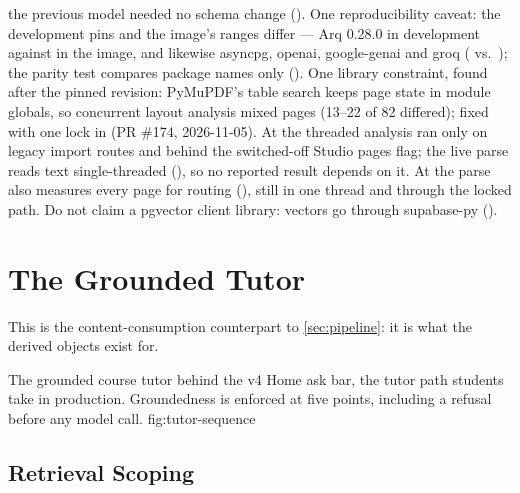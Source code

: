 {the previous model needed no schema change ().
One reproducibility caveat: the development pins and the image's ranges differ
--- Arq 0.28.0 in development against  in the image, and
likewise asyncpg, openai, google-genai and groq
( vs.\ ); the parity
test compares package names only ().
One library constraint, found after the pinned revision: PyMuPDF's table search
keeps page state in module globals, so concurrent layout analysis mixed pages
(13--22 of 82 differed); fixed with one lock in  (PR \#174,
2026-11-05). At \thesisPreviousCommit{} the threaded analysis ran only on legacy import
routes and behind the switched-off Studio pages flag; the live parse reads text
single-threaded (), so no reported
result depends on it. At \thesisCommit{} the parse also measures every page for
routing (), still in one thread and through the
locked path.
Do not claim a pgvector client library: vectors go through supabase-py
().}

\section{The Grounded Tutor}
\label{sec:tutor}

This is the content-consumption counterpart to \cref{sec:pipeline}: it is what
the derived objects exist for.

  {The grounded course tutor behind the v4 Home ask bar, the tutor path students
   take in production. Groundedness is enforced at five points, including a
   refusal before any model call.}
  {fig:tutor-sequence}

\subsection{Retrieval Scoping}
\label{sec:retrieval}

